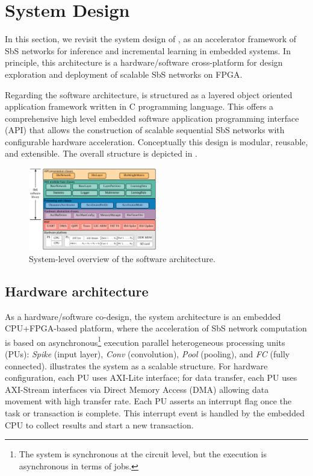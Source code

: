 \section{System Design}
\label{sec:system_design}
In this section, we revisit the system design of \cite{nevarez2020accelerator}, as an accelerator framework of SbS networks for inference and incremental learning in embedded systems. In principle, this architecture is a hardware/software cross-platform for design exploration and deployment of scalable SbS networks on FPGA.

Regarding the software architecture,  is structured as a layered object oriented application framework written in C programming language. This offers a comprehensive high level embedded software application programming interface (API) that allows the construction of scalable sequential SbS networks with configurable hardware acceleration. Conceptually this design is modular, reusable, and extensible. The overall structure is depicted in .

\begin{figure}[t!]
	\centering
	\includegraphics[width=0.5\textwidth]{../figures/sbs_software_component.pdf}
	\caption{System-level overview of the software architecture.}
	\label{fig:sw_stack}
\end{figure}

\subsection{Hardware architecture} \label{Hardware_architecture}
As a hardware/software co-design, the system architecture is an embedded CPU+FPGA-based platform, where the acceleration of SbS network computation is based on asynchronous\footnote{The system is synchronous at the circuit level, but the execution is asynchronous in terms of jobs.} execution  parallel heterogeneous processing units (PUs): \emph{Spike} (input layer), \emph{Conv} (convolution), \emph{Pool} (pooling), and \emph{FC} (fully connected).  illustrates the system  as a scalable structure. For hardware configuration, each PU uses AXI-Lite interface; for data transfer, each PU uses AXI-Stream interfaces via Direct Memory Access (DMA) allowing data movement with high transfer rate. Each PU asserts an interrupt flag once the task or transaction is complete. This interrupt event is handled by the embedded CPU to collect results and start a new transaction.

